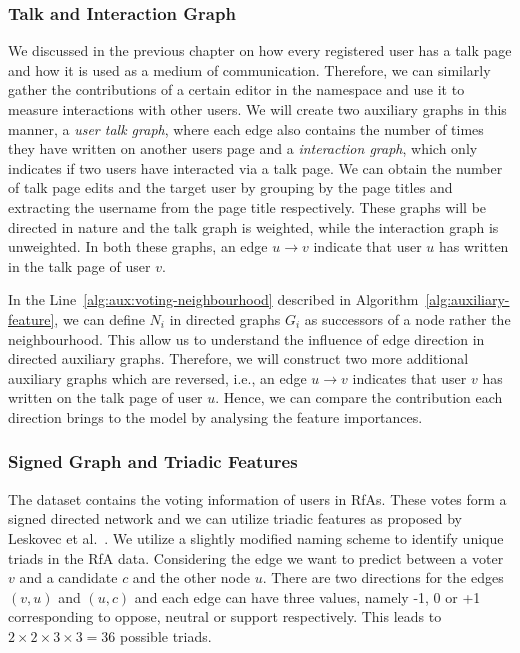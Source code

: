 \subsubsection{Talk and Interaction Graph}
\label{subsec:talk-interaction-graph}
We discussed in the previous chapter on how every registered user has a talk page and how it is used as a medium of communication. 
Therefore, we can similarly gather the contributions of a certain editor in the \usertalkNS namespace and use it to measure interactions with other users.
We will create two auxiliary graphs in this manner, a \textit{user talk graph}, where each edge also contains the number of times they have written on another users page and a \textit{interaction graph}, which only indicates if two users have interacted via a talk page. 
We can obtain the number of talk page edits and the target user by grouping by the page titles and extracting the username from the page title respectively. 
These graphs will be directed in nature and the talk graph is weighted, while the interaction graph is unweighted. 
In both these graphs, an edge $u \rightarrow v$ indicate that user $u$ has written in the talk page of user $v$.

In the Line~\ref{alg:aux:voting-neighbourhood} described in Algorithm~\ref{alg:auxiliary-feature}, we can define $N_i$ in directed graphs $G_i$ as successors of a node rather the neighbourhood.
This allow us to understand the influence of edge direction in directed auxiliary graphs.
Therefore, we will construct two more additional auxiliary graphs which are reversed, i.e., an edge $u \rightarrow v$ indicates that user $v$ has written on the talk page of user $u$.
Hence, we can compare the contribution each direction brings to the model by analysing the feature importances.

\subsubsection{Signed Graph and Triadic Features}
The \wikirfa dataset contains the voting information of users in RfAs.
These votes form a signed directed network and we can utilize triadic features as proposed by Leskovec et al.\ \cite{leskovec2010predicting}.
We utilize a slightly modified naming scheme to identify unique triads in the RfA data.
Considering the edge we want to predict between a voter $v$ and a candidate $c$ and the other node $u$.
There are two directions for the edges $(v,u)$ and $(u,c)$ and each edge can have three values, namely -1, 0 or +1 corresponding to oppose, neutral or support respectively.
This leads to $2 \times 2 \times 3 \times 3 = 36$ possible triads.

